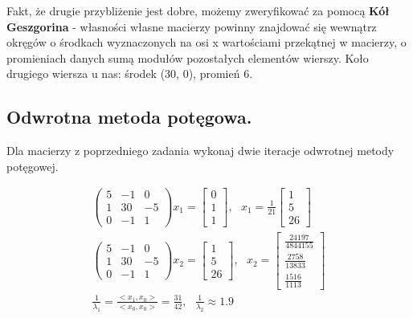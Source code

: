\documentclass[12pt]{article}
\begin{document}
    Fakt, że drugie przybliżenie jest dobre, możemy zweryfikować za pomocą \textbf{Kół Geszgorina} - własności własne
    macierzy powinny znajdować się wewnątrz okręgów o środkach wyznaczonych na osi x wartościami przekątnej w macierzy,
    o promieniach danych sumą modułów pozostałych elementów wierszy. Koło drugiego wiersza u nas: środek (30, 0),
    promień 6.\\

    \subsection{Odwrotna metoda potęgowa.}
    
    \begin{exercise}
        Dla macierzy z poprzedniego zadania wykonaj dwie iteracje odwrotnej metody potęgowej.
    \end{exercise}

    \begin{gather*}
        \begin{pmatrix}
                5 & -1 & 0\\
                1 & 30 & -5\\
                0 & -1 & 1
        \end{pmatrix}
        x_1 =
        \begin{bmatrix}
                  0 \\
                  1 \\
                  1
        \end{bmatrix}, ~~~
        x_1 = \frac{1}{21}
        \begin{bmatrix}
            1 \\
            5 \\
            26
        \end{bmatrix}\\
        \begin{pmatrix}
            5 & -1 & 0\\
            1 & 30 & -5\\
            0 & -1 & 1
        \end{pmatrix}
        x_2 =
        \begin{bmatrix}
            1 \\
            5 \\
            26
        \end{bmatrix}, ~~~
        x_2 =
        \begin{bmatrix}
            \frac{24197}{4844155} \\
            \frac{2758}{13833} \\
            \frac{1516}{1113}
        \end{bmatrix}\\
        \frac{1}{\lambda_1} = \frac{<x_1, x_0>}{<x_0, x_0>} = \frac{31}{42}, ~~~
        \frac{1}{\lambda_2} \approx 1.9
    \end{gather*}
\end{document}
